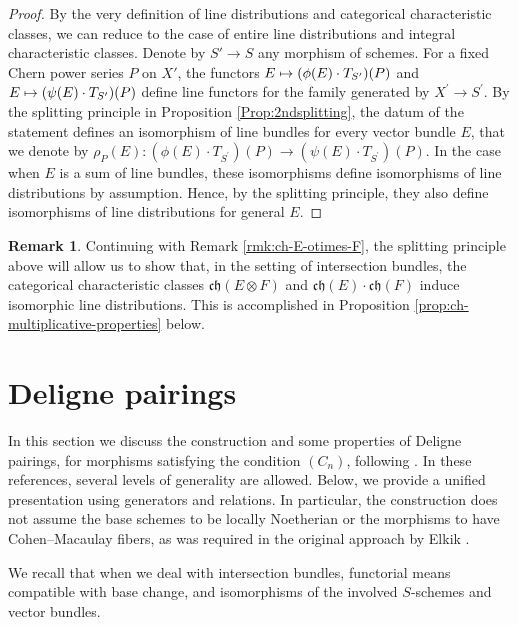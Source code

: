 \documentclass[11pt]{article}
\newcommand\mto{\mathchoice{\longmapsto}{\mapsto}{\mapsto}{\mapsto}}
\theoremstyle{plain}
\theoremstyle{definition}
\newtheorem{remark}[theorem]{Remark}
\newcommand{\chfrak}{\mathfrak {ch}}
\begin{document}
\begin{proof}
By the very definition of line distributions and categorical characteristic classes, we can reduce to the case of entire line distributions and integral characteristic classes. Denote by $S'\to S$ any morphism of schemes. For a fixed Chern power series $P$ on $X'$, the functors $E \mto (\phi(E) \cdot T_{S^{\prime}})(P)$ and $E \mto (\psi(E) \cdot T_{S'})(P)$ define line functors for the family generated by $X^{\prime}\to S^{\prime}$. By the splitting principle in Proposition \ref{Prop:2ndsplitting}, the datum of the statement defines an isomorphism of line bundles for every vector bundle $E$, that we denote by $\rho_P(E): (\phi(E) \cdot T_{S^{\prime}})(P) \to (\psi(E) \cdot T_{S^{\prime}})(P)$. In the case when $E$ is a sum of line bundles, these isomorphisms define isomorphisms of line distributions by assumption. Hence, by the splitting principle, they also define isomorphisms of line distributions for general $E$.
\end{proof}

\begin{remark}\label{rmk:ch-E-otimes-F-2}
Continuing with Remark \ref{rmk:ch-E-otimes-F}, the splitting principle above will allow us to show that, in the setting of intersection bundles, the categorical characteristic classes $\chfrak(E\otimes F)$ and $\chfrak(E)\cdot\chfrak(F)$ induce isomorphic line distributions. This is accomplished in Proposition \ref{prop:ch-multiplicative-properties} below.
\end{remark}

\section{Deligne pairings}\label{section:intersection-bundles}
In this section we discuss the construction and some properties of Deligne pairings, for morphisms satisfying the condition $(C_n)$, following \cite{Boucksom-Eriksson, Deligne-determinant, Ducrot, Elkikfib, Eriksson-Freixas-Wentworth, Munoz}. In these references, several levels of generality are allowed. Below, we provide a unified presentation using generators and relations. In particular, the construction does not assume the base schemes to be locally Noetherian or the morphisms to have Cohen--Macaulay fibers, as was required in the original approach by Elkik \cite{Elkikfib}.

We recall that when we deal with intersection bundles, functorial means compatible with base change, and isomorphisms of the involved $S$-schemes and vector bundles.
\end{document}
